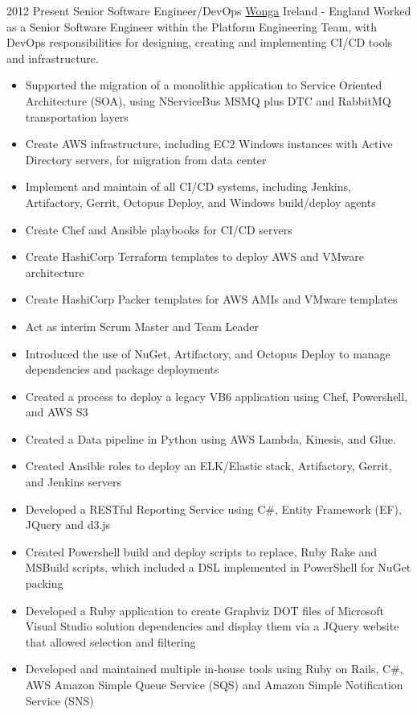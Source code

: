 
\begin{twenty}
\twentyitem
  {2012}
  {Present}
  {Senior Software Engineer/DevOps}
  {\href{https://www.wonga.com/}{Wonga}}
  {Ireland - England}
  {Worked as a Senior Software Engineer within the Platform Engineering Team, with DevOps responsibilities for designing, creating and implementing CI/CD tools and infrastructure.}
  {\begin{itemize}
    \item Supported the migration of a monolithic application to Service Oriented Architecture (SOA), using NServiceBus MSMQ plus DTC and RabbitMQ transportation layers
    \item Create AWS infrastructure, including EC2 Windows instances with Active Directory servers, for migration from data center
    \item Implement and maintain of all CI/CD systems, including Jenkins, Artifactory, Gerrit, Octopus Deploy, and Windows build/deploy agents
    \item Create Chef and Ansible playbooks for CI/CD servers
    \item Create HashiCorp Terraform templates to deploy AWS and VMware architecture
    \item Create HashiCorp Packer templates for AWS AMIs and VMware templates
    \item Act as interim Scrum Master and Team Leader
  \end{itemize}
  }
  {\begin{itemize}
    \item Introduced the use of NuGet, Artifactory, and Octopus Deploy to manage dependencies and package deployments
    \item Created a process to deploy a legacy VB6 application using Chef, Powershell, and AWS S3
    \item Created a Data pipeline in Python using AWS Lambda, Kinesis, and Glue.
    \item Created Ansible roles to deploy an ELK/Elastic stack, Artifactory, Gerrit, and Jenkins servers
    \item Developed a RESTful Reporting Service using C\#, Entity Framework (EF), JQuery and d3.js
    \item Created Powershell build and deploy scripts to replace, Ruby Rake and MSBuild scripts, which included a DSL implemented in PowerShell for NuGet packing
    \item Developed a Ruby application to create Graphviz DOT files of Microsoft Visual Studio solution dependencies and display them via a JQuery website that allowed selection and filtering
    \item Developed and maintained multiple in-house tools using Ruby on Rails, C\#, AWS Amazon Simple Queue Service (SQS) and Amazon Simple Notification Service (SNS)
  \end{itemize}
  }
\end{twenty}

\vspace{0.25\baselineskip}
